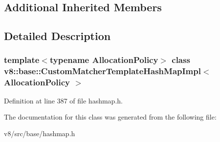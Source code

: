 \subsection*{Additional Inherited Members}


\subsection{Detailed Description}
\subsubsection*{template$<$typename Allocation\+Policy$>$\newline
class v8\+::base\+::\+Custom\+Matcher\+Template\+Hash\+Map\+Impl$<$ Allocation\+Policy $>$}



Definition at line 387 of file hashmap.\+h.



The documentation for this class was generated from the following file\+:\begin{DoxyCompactItemize}
\item 
v8/src/base/hashmap.\+h\end{DoxyCompactItemize}
